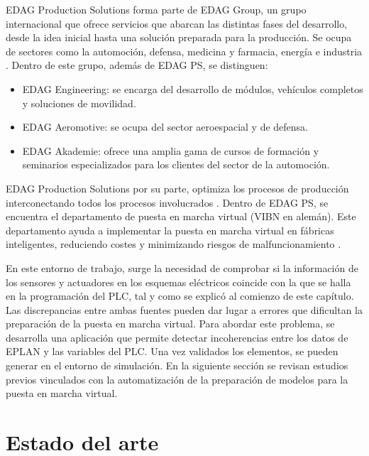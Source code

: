 EDAG Production Solutions forma parte de EDAG Group, un grupo internacional que ofrece servicios que abarcan las distintas fases del desarrollo, desde la idea inicial hasta una solución preparada para la producción. Se ocupa de sectores como la automoción, defensa, medicina y farmacia, energía e industria . Dentro de este grupo, además de EDAG PS, se distinguen:

\begin{itemize}

\item EDAG Engineering: se encarga del desarrollo de módulos, vehículos completos y soluciones de movilidad.

\item EDAG Aeromotive: se ocupa del sector aeroespacial y de defensa.

\item EDAG Akademie: ofrece una amplia gama de cursos de formación y seminarios especializados para los clientes del sector de la automoción.

\end{itemize}


EDAG Production Solutions por su parte, optimiza los procesos de producción interconectando todos los procesos involucrados . Dentro de EDAG PS, se encuentra el departamento de puesta en marcha virtual (VIBN en alemán). Este departamento ayuda a implementar la puesta en marcha virtual en fábricas inteligentes, reduciendo costes y minimizando riesgos de malfuncionamiento .

En este entorno de trabajo, surge la necesidad de comprobar si la información de los sensores y actuadores en los esquemas eléctricos coincide con la que se halla en la programación del PLC, tal y como se explicó al comienzo de este capítulo. Las discrepancias entre ambas fuentes pueden dar lugar a errores que dificultan la preparación de la puesta en marcha virtual. Para abordar este problema, se desarrolla una aplicación que permite detectar incoherencias entre los datos de EPLAN y las variables del PLC. Una vez validados los elementos, se pueden generar en el entorno de simulación. En la siguiente sección se revisan estudios previos vinculados con la automatización de la preparación de modelos para la puesta en marcha virtual.\\


\section{Estado del arte} \label{sec:estado_arte}

